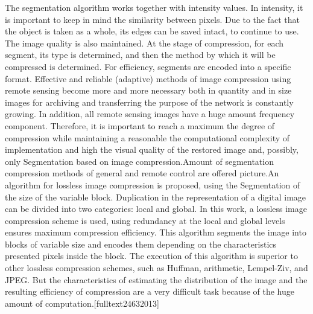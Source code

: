 \vspace{-0.5cm}
\noindent The segmentation algorithm works together with intensity values. In intensity, it is important to keep in mind the similarity between pixels. Due to the fact that the object is taken as a whole, its edges can be saved intact, to continue to use. The image quality is also maintained. At the stage of compression, for each segment, its type is determined, and then the method by which it will be compressed is determined. For efficiency, segments are encoded into a specific format.
Effective and reliable (adaptive) methods of image compression using remote sensing become more and more necessary both in quantity and in size images for archiving and transferring the purpose of the network is constantly growing. In addition, all remote sensing images have a huge amount frequency component. Therefore, it is important to reach a maximum the degree of compression while maintaining a reasonable the computational complexity of implementation and high the visual quality of the restored image and, possibly, only Segmentation based on image compression.Amount of segmentation compression methods of general and remote control are offered picture.An algorithm for lossless image compression is proposed, using the Segmentation of the size of the variable block. Duplication in the representation of a digital image can be divided into two categories: local and global. In this work, a lossless image compression scheme is used, using redundancy at the local and global levels ensures maximum compression efficiency. This algorithm segments the image into blocks of variable size and encodes them depending on the characteristics presented pixels inside the block. The execution of this algorithm is superior to other lossless compression schemes, such as Huffman, arithmetic, Lempel-Ziv, and JPEG. But the characteristics of estimating the distribution of the image and the resulting efficiency of compression are a very difficult task because of the huge amount of computation.[fulltext24632013]



\vspace{-0.3cm}

